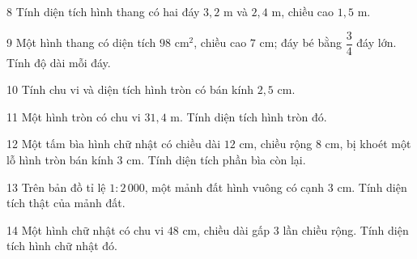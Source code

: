 \gap
\begin{probbox}{8}{\relax}
Tính diện tích hình thang có hai đáy $3{,}2$ m và $2{,}4$ m, chiều cao $1{,}5$ m.
\end{probbox}
\gap
\begin{probbox}{9}{\relax}
Một hình thang có diện tích $98$ cm$^2$, chiều cao $7$ cm; đáy bé bằng $\dfrac34$ đáy lớn. Tính độ dài mỗi đáy.
\end{probbox}
\gap
\begin{probbox}{10}{\relax}
Tính chu vi và diện tích hình tròn có bán kính $2{,}5$ cm.
\end{probbox}
\gap
\begin{probbox}{11}{\relax}
Một hình tròn có chu vi $31{,}4$ m. Tính diện tích hình tròn đó.
\end{probbox}
\gap
\begin{probbox}{12}{\relax}
Một tấm bìa hình chữ nhật có chiều dài $12$ cm, chiều rộng $8$ cm, bị khoét một lỗ hình tròn bán kính $3$ cm. Tính diện tích phần bìa còn lại.
\end{probbox}
\gap
\begin{probbox}{13}{\relax}
Trên bản đồ tỉ lệ $1:2\,000$, một mảnh đất hình vuông có cạnh $3$ cm. Tính diện tích thật của mảnh đất.
\end{probbox}
\gap
\begin{probbox}{14}{}
Một hình chữ nhật có chu vi $48$ cm, chiều dài gấp $3$ lần chiều rộng. Tính diện tích hình chữ nhật đó.
\end{probbox}
